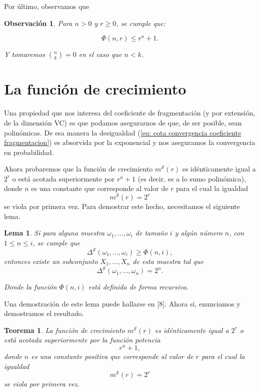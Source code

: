 \documentclass{report}
\newtheorem{thm}{Teorema}[section]
\newtheorem{lem}{Lema}[section]
\newtheorem{obs}{Observación}[section]
\begin{document}
Por último, observamos que

\begin{obs}   
Para \( n > 0 \) y \( r \geq 0 \), se cumple que:

\[
\Phi(n, r) \leq r^n + 1.
\]

Y tomaremos \( \binom{n}{k} = 0 \) en el caso que \( n < k \).\newline
\end{obs}

\section{La función de crecimiento}

Una propiedad que nos interesa del coeficiente de fragmentación (y por extensión, de la dimensión VC) es que podamos asegurarnos
de que, de ser posible, sean polinómicas. De esa manera la desigualdad (\ref{eq: cota convergencia coeficiente fragmentacion})
es absorvida por la exponencial y nos aseguramos la convergencia en probabilidad. \newline

Ahora probaremos que la función de crecimiento $m^{\mathcal{S}}(r)$ 
es idénticamente igual a \( 2^r \) o está acotada superiormente por \( r^n + 1 \) (es decir, es a lo sumo polinómica),  
donde \( n \) es una constante que corresponde al valor de \( r \) para el cual la igualdad  
\[
m^{\mathcal{S}}(r) = 2^r
\]
se viola por primera vez. Para demostrar este hecho, necesitamos el siguiente lema.\newline

\begin{lem}\label{Lema 1}
Si para alguna muestra  \( \omega_1, \ldots, \omega_i \) de tamaño $i$ y algún número \( n \), con \( 1 \leq n \leq i \),  
se cumple que  
\[
\Delta^{\mathcal{S}}(\omega_1, \ldots, \omega_i) \geq \Phi(n, i),
\]  
entonces existe un subconjunto \( X_1, \dots, X_n \) de esta muestra tal que  
\[
\Delta^{\mathcal{S}}(\omega_1, \dots, \omega_n) = 2^n.
\]  

Donde la función \( \Phi(n, i) \) está definida de forma recursiva.  \newline
\end{lem}

Una demostración de este lema puede hallarse en [8].
Ahora si, enunciamos y demostramos el resultado.\newline

\begin{thm} \label{teo: cota polinomica de la función de crecimiento}
    La función de crecimiento \( m^{\mathcal{S}}(r) \) es idénticamente igual a \( 2^r \) o está acotada superiormente por la función potencia  
    \[
    r^n + 1,
    \]
    donde \( n \) es una constante positiva que corresponde al valor de \( r \) para el cual la igualdad  
    \[
    m^{\mathcal{S}}(r) = 2^r
    \]
    se viola por primera vez.    
\end{thm}
\end{document}

